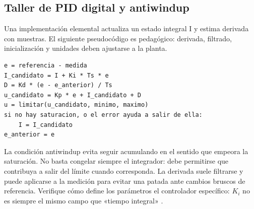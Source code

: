 \subsection{Taller de PID digital y antiwindup}
Una implementación elemental actualiza un estado integral I y estima derivada con muestras. El siguiente pseudocódigo es pedagógico: derivada, filtrado, inicialización y unidades deben ajustarse a la planta.
\begin{lstlisting}
e = referencia - medida
I_candidato = I + Ki * Ts * e
D = Kd * (e - e_anterior) / Ts
u_candidato = Kp * e + I_candidato + D
u = limitar(u_candidato, minimo, maximo)
si no hay saturacion, o el error ayuda a salir de ella:
    I = I_candidato
e_anterior = e
\end{lstlisting}
La condición antiwindup evita seguir acumulando en el sentido que empeora la saturación. No basta congelar siempre el integrador: debe permitirse que contribuya a salir del límite cuando corresponda. La derivada suele filtrarse y puede aplicarse a la medición para evitar una patada ante cambios bruscos de referencia. Verifique cómo define los parámetros el controlador específico: $K_i$ no es siempre el mismo campo que «tiempo integral» \cite{control,pid}.

